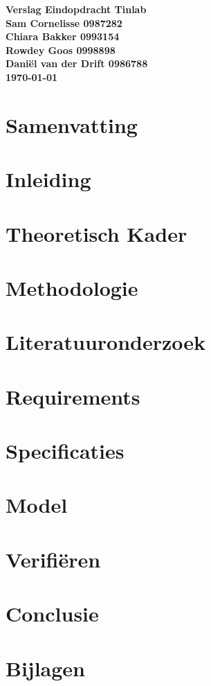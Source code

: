 \documentclass{article}
\begin{document}
\sffamily
\begin{titlepage}
  \centering
    \vfill
    {\bfseries\Huge
      Verslag Eindopdracht Tinlab \\
        \vskip2cm
      }
      {\bfseries\Large
        Sam Cornelisse 0987282\\
	Chiara Bakker 0993154\\
	Rowdey Goos 0998898\\
	Daniël van der Drift 0986788\\
      }
      {
        \bfseries\normalsize
        \vskip1cm
        \today\\
    }
    \vfill
    \vfill
    \vfill
\end{titlepage}
\newpage
\tableofcontents

\newpage
\section{Samenvatting}


\section{Inleiding}


\section{Theoretisch Kader}


\section{Methodologie}


\section{Literatuuronderzoek}


\section{Requirements}


\section{Specificaties}


\section{Model}


\section{Verifiëren}


\section{Conclusie}


\newpage
\section{Bijlagen}

\newpage


\end{document}
